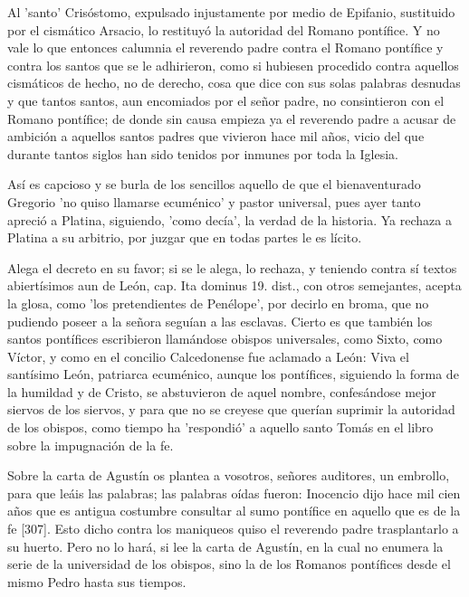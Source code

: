 Al 'santo' Crisóstomo, expulsado injustamente por medio de Epifanio, sustituido por el cismático Arsacio, lo restituyó la autoridad del Romano pontífice. Y no vale lo que entonces calumnia el reverendo padre contra el Romano pontífice y contra los santos que se le adhirieron, como si hubiesen procedido contra aquellos cismáticos de hecho, no de derecho, cosa que dice con sus solas palabras desnudas y que tantos santos, aun encomiados por el señor padre, no consintieron con el Romano pontífice; de donde sin causa empieza ya el reverendo padre a acusar de ambición a aquellos santos padres que vivieron hace mil años, vicio del que durante tantos siglos han sido tenidos por inmunes por toda la Iglesia.

Así es capcioso y se burla de los sencillos aquello de que el bienaventurado Gregorio 'no quiso llamarse ecuménico' y pastor universal, pues ayer tanto apreció a Platina, siguiendo, 'como decía', la verdad de la historia. Ya rechaza a Platina a su arbitrio, por juzgar que en todas partes le es lícito.

Alega el decreto en su favor; si se le alega, lo rechaza, y teniendo contra sí textos abiertísimos aun de León, cap. Ita dominus 19. dist., con otros semejantes, acepta la glosa, como 'los pretendientes de Penélope', por decirlo en broma, que no pudiendo poseer a la señora seguían a las esclavas. Cierto es que también los santos pontífices escribieron llamándose obispos universales, como Sixto, como Víctor, y como en el concilio Calcedonense fue aclamado a León: Viva el santísimo León, patriarca ecuménico, aunque los pontífices, siguiendo la forma de la humildad y de Cristo, se abstuvieron de aquel nombre, confesándose mejor siervos de los siervos, y para que no se creyese que querían suprimir la autoridad de los obispos, como tiempo ha 'respondió' a aquello santo Tomás en el libro sobre la impugnación de la fe.

Sobre la carta de Agustín os plantea a vosotros, señores auditores, un embrollo, para que leáis las palabras; las palabras oídas fueron: Inocencio dijo hace mil cien años que es antigua costumbre consultar al sumo pontífice en aquello que es de la fe [307]. Esto dicho contra los maniqueos quiso el reverendo padre trasplantarlo a su huerto. Pero no lo hará, si lee la carta de Agustín, en la cual no enumera la serie de la universidad de los obispos, sino la de los Romanos pontífices desde el mismo Pedro hasta sus tiempos.

